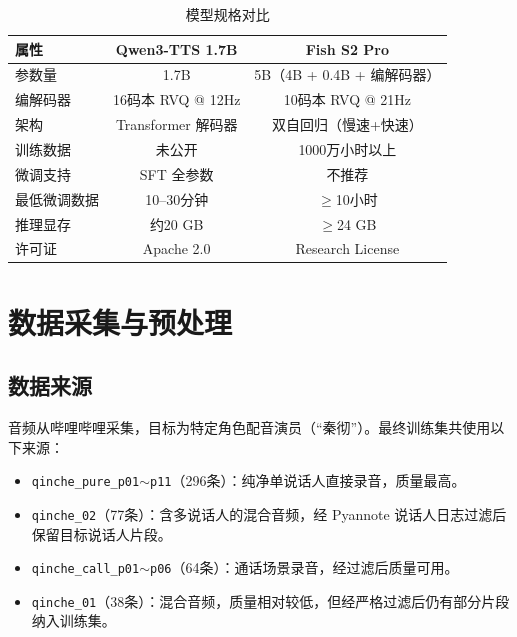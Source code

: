 \documentclass[a4paper, 11pt]{article}
\begin{document}
\begin{table}[htbp]
\centering
\caption{模型规格对比}
\label{tab:models}
\begin{tabular}{@{}lcc@{}}
\toprule
\textbf{属性} & \textbf{Qwen3-TTS 1.7B} & \textbf{Fish S2 Pro} \\
\midrule
参数量       & 1.7B & 5B（4B + 0.4B + 编解码器）\\
编解码器     & 16码本 RVQ @ 12Hz & 10码本 RVQ @ 21Hz \\
架构         & Transformer 解码器 & 双自回归（慢速+快速）\\
训练数据     & 未公开 & 1000万小时以上 \\
微调支持     & SFT 全参数 & 不推荐 \\
最低微调数据 & 10--30分钟 & $\geq$10小时 \\
推理显存     & 约20 GB & $\geq$24 GB \\
许可证       & Apache 2.0 & Research License \\
\bottomrule
\end{tabular}
\end{table}


\section{数据采集与预处理}

\subsection{数据来源}

音频从哔哩哔哩采集，目标为特定角色配音演员（``秦彻''）。最终训练集共使用以下来源：

\begin{itemize}[leftmargin=2em, itemsep=2pt]
  \item \texttt{qinche\_pure\_p01}$\sim$\texttt{p11}（296条）：纯净单说话人直接录音，质量最高。
  \item \texttt{qinche\_02}（77条）：含多说话人的混合音频，经 Pyannote 说话人日志过滤后保留目标说话人片段。
  \item \texttt{qinche\_call\_p01}$\sim$\texttt{p06}（64条）：通话场景录音，经过滤后质量可用。
  \item \texttt{qinche\_01}（38条）：混合音频，质量相对较低，但经严格过滤后仍有部分片段纳入训练集。
\end{itemize}
\end{document}
